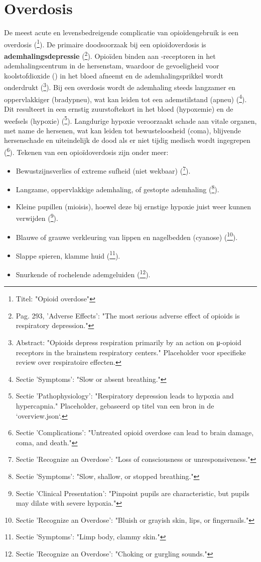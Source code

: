 \documentclass[11pt, a4paper]{report} %
\begin{document}
\section{Overdosis}
De meest acute en levensbedreigende complicatie van opioïdengebruik is een overdosis (\cite{WHO2023Opioid}\footnote{Titel: "Opioid overdose"}). De primaire doodsoorzaak bij een opioïdoverdosis is \textbf{ademhalingsdepressie} (\cite{Gupta2010ChemistryOpioids}\footnote{Pag. 293, 'Adverse Effects': "The most serious adverse effect of opioids is respiratory depression."}). Opioïden binden aan \textmu-receptoren in het ademhalingscentrum in de hersenstam, waardoor de gevoeligheid voor koolstofdioxide () in het bloed afneemt en de ademhalingsprikkel wordt onderdrukt (\cite{Pattinson2008OpioidsRespiration}\footnote{Abstract: "Opioids depress respiration primarily by an action on μ-opioid receptors in the brainstem respiratory centers." Placeholder voor specifieke review over respiratoire effecten.}). Bij een overdosis wordt de ademhaling steeds langzamer en oppervlakkiger (bradypneu), wat kan leiden tot een ademstilstand (apneu) (\cite{WHO2023Opioid}\footnote{Sectie 'Symptoms': "Slow or absent breathing."}). Dit resulteert in een ernstig zuurstoftekort in het bloed (hypoxemie) en de weefsels (hypoxie) (\cite{SchillerMechanic2019OpioidOverdose}\footnote{Sectie 'Pathophysiology': "Respiratory depression leads to hypoxia and hypercapnia." Placeholder, gebaseerd op titel van een bron in de `overview.json`.}). Langdurige hypoxie veroorzaakt schade aan vitale organen, met name de hersenen, wat kan leiden tot bewusteloosheid (coma), blijvende hersenschade en uiteindelijk de dood als er niet tijdig medisch wordt ingegrepen (\cite{WHO2023Opioid}\footnote{Sectie 'Complications': "Untreated opioid overdose can lead to brain damage, coma, and death."}). Tekenen van een opioïdoverdosis zijn onder meer:
\begin{itemize}
    \item Bewustzijnsverlies of extreme sufheid (niet wekbaar) (\cite{CDCPreventingOverdose}\footnote{Sectie 'Recognize an Overdose': "Loss of consciousness or unresponsiveness."}).
    \item Langzame, oppervlakkige ademhaling, of gestopte ademhaling (\cite{WHO2023Opioid}\footnote{Sectie 'Symptoms': "Slow, shallow, or stopped breathing."}).
    \item Kleine pupillen (mioisis), hoewel deze bij ernstige hypoxie juist weer kunnen verwijden (\cite{SchillerMechanic2019OpioidOverdose}\footnote{Sectie 'Clinical Presentation': "Pinpoint pupils are characteristic, but pupils may dilate with severe hypoxia."}).
    \item Blauwe of grauwe verkleuring van lippen en nagelbedden (cyanose) (\cite{CDCPreventingOverdose}\footnote{Sectie 'Recognize an Overdose': "Bluish or grayish skin, lips, or fingernails."}).
    \item Slappe spieren, klamme huid (\cite{WHO2023Opioid}\footnote{Sectie 'Symptoms': "Limp body, clammy skin."}).
    \item Snurkende of rochelende ademgeluiden (\cite{CDCPreventingOverdose}\footnote{Sectie 'Recognize an Overdose': "Choking or gurgling sounds."}).
\end{itemize}
\end{document}
